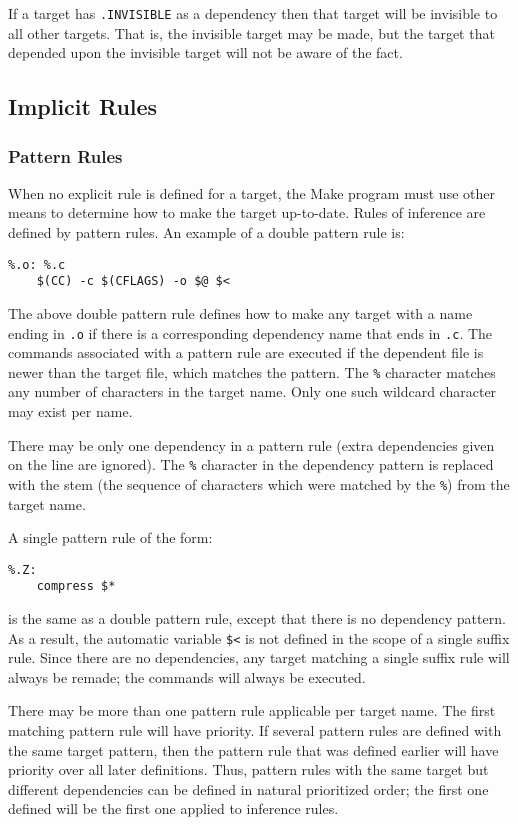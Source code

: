 If a target has {\tt .INVISIBLE} as a dependency then that target will be
invisible to all other targets.  That is, the invisible target may be made,
but the target that depended upon the invisible target will not be aware of
the fact.

\subsection{Implicit Rules}

\subsubsection{Pattern Rules}

When no explicit rule is defined for a target, the Make program must use
other means to determine how to make the target up-to-date.  Rules of
inference are defined by pattern rules.  An example of a double pattern
rule is:

\begin{verbatim}
%.o: %.c
    $(CC) -c $(CFLAGS) -o $@ $<
\end{verbatim}

The above double pattern rule defines how to make any target with a name
ending in {\tt .o} if there is a corresponding dependency name that ends in
{\tt .c}.  The commands associated with a pattern rule are executed if the
dependent file is newer than the target file, which matches the pattern.
The {\tt \%} character matches any number of characters in the target name.
Only one such wildcard character may exist per name.

There may be only one dependency in a pattern rule (extra dependencies
given on the line are ignored).  The {\tt \%} character in the dependency
pattern is replaced with the stem (the sequence of characters which were
matched by the {\tt \%}) from the target name.

A single pattern rule of the form:

\begin{verbatim}
%.Z:
    compress $*
\end{verbatim}

is the same as a double pattern rule, except that there is no dependency
pattern.  As a result, the automatic variable {\tt \$<} is not defined in the
scope of a single suffix rule.  Since there are no dependencies, any target
matching a single suffix rule will always be remade; the commands will
always be executed.

There may be more than one pattern rule applicable per target name.  The
first matching pattern rule will have priority.  If several pattern rules
are defined with the same target pattern, then the pattern rule that was
defined earlier will have priority over all later definitions.  Thus,
pattern rules with the same target but different dependencies can be
defined in natural prioritized order; the first one defined will be the
first one applied to inference rules.

